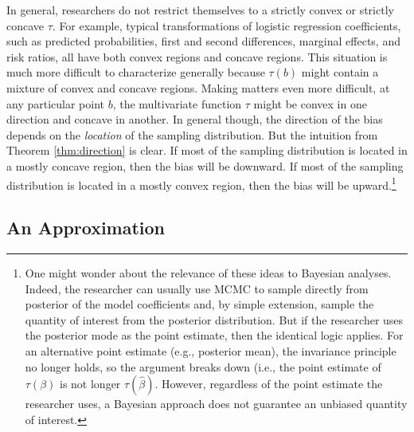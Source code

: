 \documentclass[12pt]{article}
\begin{document}
In general, researchers do not restrict themselves to a strictly convex or strictly concave $\tau$. 
For example, typical transformations of logistic regression coefficients, such as predicted probabilities, first and second differences, marginal effects, and risk ratios, all have both convex regions and concave regions. 
This situation is much more difficult to characterize generally because $\tau(b)$ might contain a mixture of convex and concave regions. 
Making matters even more difficult, at any particular point $b$, the multivariate function $\tau$ might be convex in one direction and concave in another. 
In general though, the direction of the bias depends on the \textit{location} of the sampling distribution. 
But the intuition from Theorem \ref{thm:direction} is clear.
If most of the sampling distribution is located in a mostly concave region, then the bias will be downward. 
If most of the sampling distribution is located in a mostly convex region, then the bias will be upward.\footnote{One might wonder about the relevance of these ideas to Bayesian analyses. 
Indeed, the researcher can usually use MCMC to sample directly from posterior of the model coefficients and, by simple extension, sample the quantity of interest from the posterior distribution. 
But if the researcher uses the posterior mode as the point estimate, then the identical logic applies. 
For an alternative point estimate (e.g., posterior mean), the invariance principle no longer holds, so the argument breaks down (i.e., the point estimate of $\tau(\beta)$ is not longer $\tau(\hat{\beta})$. 
However, regardless of the point estimate the researcher uses, a Bayesian approach does not guarantee an unbiased quantity of interest.}

\subsection*{An Approximation}
\end{document}
